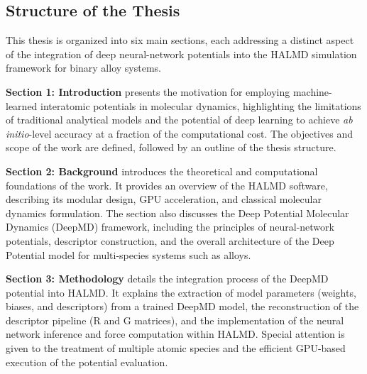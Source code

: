 \documentclass[a4paper,11pt,oneside]{article}
\begin{document}


\subsection{Structure of the Thesis}

This thesis is organized into six main sections, each addressing a distinct aspect of the integration of deep neural-network potentials into the HALMD simulation framework for binary alloy systems.

\textbf{Section 1: Introduction} presents the motivation for employing machine-learned interatomic potentials in molecular dynamics, highlighting the limitations of traditional analytical models and the potential of deep learning to achieve \textit{ab initio}-level accuracy at a fraction of the computational cost. The objectives and scope of the work are defined, followed by an outline of the thesis structure.

\textbf{Section 2: Background} introduces the theoretical and computational foundations of the work. It provides an overview of the HALMD software, describing its modular design, GPU acceleration, and classical molecular dynamics formulation. The section also discusses the Deep Potential Molecular Dynamics (DeepMD) framework, including the principles of neural-network potentials, descriptor construction, and the overall architecture of the Deep Potential model for multi-species systems such as alloys.

\textbf{Section 3: Methodology} details the integration process of the DeepMD potential into HALMD. It explains the extraction of model parameters (weights, biases, and descriptors) from a trained DeepMD model, the reconstruction of the descriptor pipeline (R and G matrices), and the implementation of the neural network inference and force computation within HALMD. Special attention is given to the treatment of multiple atomic species and the efficient GPU-based execution of the potential evaluation.
\end{document}

